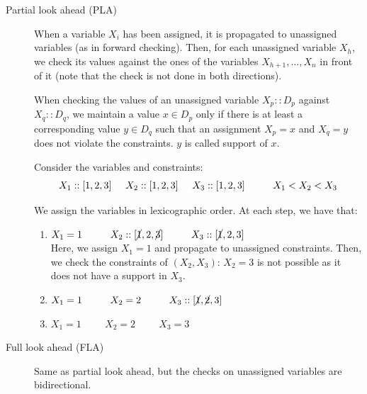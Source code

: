 \begin{description}
    \item[Partial look ahead (PLA)] 
        When a variable $X_i$ has been assigned, it is propagated to unassigned variables (as in forward checking).
        Then, for each unassigned variable $X_h$, we check its values against the ones of the variables $X_{h+1}, \dots, X_{n}$ in front of it 
        (note that the check is not done in both directions).
        
        When checking the values of an unassigned variable $X_p :: D_p$ against $X_q :: D_q$, 
        we maintain a value $x \in D_p$ only if there is at least a corresponding value $y \in D_q$ such that 
        an assignment $X_p=x$ and $X_q=y$ does not violate the constraints. 
        $y$ is called support  of $x$. 

        \begin{example}
            Consider the variables and constraints: 
            \[ X_1 :: [1, 2, 3] \hspace{0.5cm} X_2 :: [1, 2, 3] \hspace{0.5cm} X_3 :: [1, 2, 3]  \hspace{1cm}  X_1 < X_2 < X_3 \]

            We assign the variables in lexicographic order. At each step, we have that:
            \begin{enumerate}
                \item $X_1 = 1 \hspace{1cm} X_2 :: [\cancel{1}, 2, \cancel{3}] \hspace{1cm} X_3 :: [\cancel{1}, 2, 3]$ \\
                    Here, we assign $X_1=1$ and propagate to unassigned constraints.
                    Then, we check the constraints of $(X_2, X_3)$: $X_2 = 3$ is not possible as it does not have a support in $X_3$.
                \item $X_1 = 1 \hspace{1cm} X_2 = 2 \hspace{1cm} X_3 :: [\cancel{1}, \cancel{2}, 3]$
                \item $X_1 = 1 \hspace{1cm} X_2 = 2 \hspace{1cm} X_3 = 3$
            \end{enumerate}
        \end{example}

    \item[Full look ahead (FLA)] 
        Same as partial look ahead, but the checks on unassigned variables are bidirectional.


\end{description}
